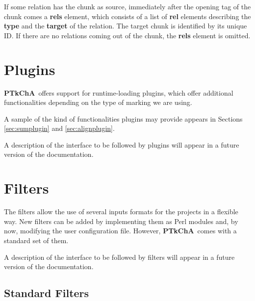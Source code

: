\documentclass{article}
\newcommand{\ptkcha}{\textbf{PTkChA}}
\begin{document}
If some relation has the chunk as source, immediately after the
opening tag of the chunk comes a \textbf{rels} element, which consists
of a list of \textbf{rel} elements describing the \textbf{type} and
the \textbf{target} of the relation. The target chunk is identified by
its unique ID. If there are no relations coming out of the chunk, the
\textbf{rels} element is omitted.

\section{Plugins}
\label{sec:plugins}

\ptkcha\ offers support for runtime-loading plugins, which offer
additional functionalities depending on the type of marking we are
using.

A sample of the kind of functionalities plugins may provide appears in
Sections \ref{sec:sumplugin} and \ref{sec:alignplugin}.

A description of the interface to be followed by plugins will appear
in a future version of the documentation.

\section{Filters}
\label{sec:filters}

The filters allow the use of several inputs formats for the projects
in a flexible way. New filters can be added by implementing them as
Perl modules and, by now, modifying the user configuration
file. However, \ptkcha\ comes with a standard set of them.

A description of the interface to be followed by filters will appear
in a future version of the documentation.

\subsection{Standard Filters}
\end{document}
